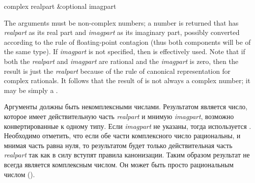\begin{defun}[Function]
complex realpart &optional imagpart

The arguments must be non-complex numbers; a number is returned
that has \emph{realpart} as its real part and \emph{imagpart} as its imaginary
part, possibly converted according to the rule of floating-point
contagion (thus both components will be of the same type).
If \emph{imagpart} is not specified,
then  is
effectively used.  Note that if both the \emph{realpart} and \emph{imagpart} are
rational and the \emph{imagpart} is zero, then the result is just the
\emph{realpart} because of the rule of canonical representation
for complex rationals.  It follows that the result of 
is not always a complex number; it may be simply a .

Аргументы должны быть некомплексными числами. Результатом является число,
которое имеет действительную часть \emph{realpart} и мнимую \emph{imagpart},
возможно конвертированные к одному типу.
Если \emph{imagpart} не указаны, тогда используется .
Необходимо отметить, что если обе части комплексного число рациональны, и мнимая
часть равна нуля, то результатом будет только действительная часть
\emph{realpart} так как в силу вступят правила канонизации.
Таким образом результат  не всегда является комплексным числом. Он
может быть просто рациональным числом ().
\end{defun}

